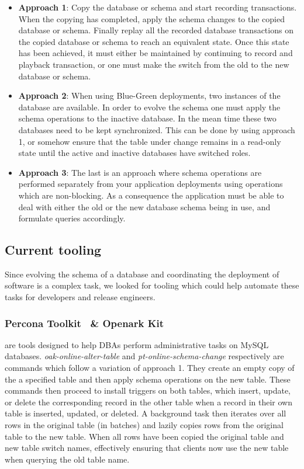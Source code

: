\documentclass[conference]{IEEEtran}
\begin{document}
\begin{itemize}
  \item{\textbf{Approach 1}: Copy the database or schema and start recording transactions. When the copying has completed, apply the schema changes to the copied database or schema. Finally replay all the recorded database transactions on the copied database or schema to reach an equivalent state. Once this state has been achieved, it must either be maintained by continuing to record and playback transaction, or one must make the switch from the old to the new database or schema.}
  \item{\textbf{Approach 2}: When using Blue-Green deployments, two instances of the database are available. In order to evolve the schema one must apply the schema operations to the inactive database. In the mean time these two databases need to be kept synchronized. This can be done by using approach 1, or somehow ensure that the table under change remains in a read-only state until the active and inactive databases have switched roles.}
  \item{\textbf{Approach 3}: The last is an approach where schema operations are performed separately from your application deployments using operations which are non-blocking. As a consequence the application must be able to deal with either the old or the new database schema being in use, and formulate queries accordingly.}
\end{itemize}

\subsection{Current tooling} 
Since evolving the schema of a database and coordinating the deployment of software is a complex task, we looked for tooling which could help automate these tasks for developers and release engineers.

\subsubsection{Percona Toolkit~\cite{PerconaToolkit} \& Openark Kit~\cite{OpenarkKit}}
are tools designed to help DBAs perform administrative tasks on MySQL databases. \textit{oak-online-alter-table} and \textit{pt-online-schema-change} respectively are commands which follow a variation of approach 1. They create an empty copy of the a specified table and then apply schema operations on the new table. These commands then proceed to install triggers on both tables, which insert, update, or delete the corresponding record in the other table when a record in their own table is inserted, updated, or deleted. A background task then iterates over all rows in the original table (in batches) and lazily copies rows from the original table to the new table. When all rows have been copied the original table and new table switch names, effectively ensuring that clients now use the new table when querying the old table name.
\end{document}
